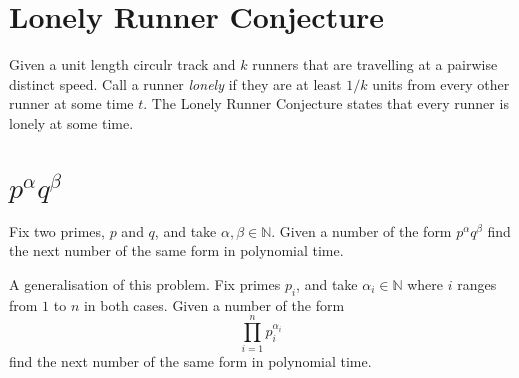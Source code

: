 \documentclass[a4paper]{article}
\begin{document}
\section{Lonely Runner Conjecture}
Given a unit length circulr track and $k$ runners that are travelling at a pairwise distinct speed. Call a runner \emph{lonely} if they are at least $1/k$ units from every other runner at some time $t$. The Lonely Runner Conjecture states that every runner is lonely at some time.

\section{$p^\alpha q^\beta$}
Fix two primes, $p$ and $q$, and take $\alpha,\beta\in\mathbb{N}$. Given a number of the form $p^\alpha q^\beta$ find the next number of the same form in polynomial time.

A generalisation of this problem. Fix primes $p_i$, and take $\alpha_i\in\mathbb{N}$ where $i$ ranges from $1$ to $n$ in both cases. Given a number of the form $$\prod_{i=1}^{n}p_{i}^{\alpha_i}$$ find the next number of the same form in polynomial time.
\end{document}
